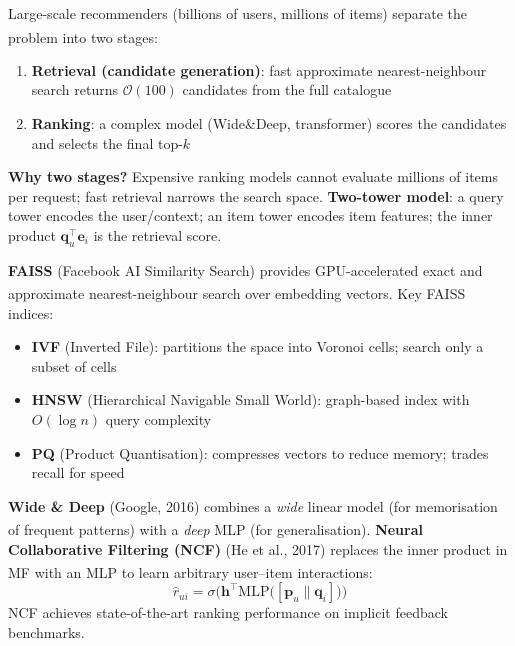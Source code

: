 \begin{tcbitemize}[ skin=sectionraster ]

    \tcbitem[title=Two-Stage Retrieval Architecture, raster multicolumn=6]
    Large-scale recommenders (billions of users, millions of items) separate the problem into two stages\textsuperscript{\cite[][pp.~95--100]{aggarwalRecommenderSystems2016}}:
    \begin{enumerate}
        \item \textbf{Retrieval (candidate generation)}: fast approximate nearest-neighbour search returns $\mathcal{O}(100)$ candidates from the full catalogue
        \item \textbf{Ranking}: a complex model (Wide\&Deep, transformer) scores the candidates and selects the final top-$k$
    \end{enumerate}
    \tcblower
    \textbf{Why two stages?} Expensive ranking models cannot evaluate millions of items per request; fast retrieval narrows the search space.
    \textbf{Two-tower model}: a query tower encodes the user/context; an item tower encodes item features; the inner product $\mathbf{q}_u^\top \mathbf{e}_i$ is the retrieval score.

    \tcbitem[title={Approximate Nearest Neighbour (ANN)}, raster multicolumn=3]
    \textbf{FAISS} (Facebook AI Similarity Search) provides GPU-accelerated exact and approximate nearest-neighbour search over embedding vectors\textsuperscript{\cite[][p.~535]{liFaissLibraryEfficient2019}}.
    Key FAISS indices:
    \begin{itemize}
        \item \textbf{IVF} (Inverted File): partitions the space into Voronoi cells; search only a subset of cells
        \item \textbf{HNSW} (Hierarchical Navigable Small World): graph-based index with $O(\log n)$ query complexity
        \item \textbf{PQ} (Product Quantisation): compresses vectors to reduce memory; trades recall for speed
    \end{itemize}

    \tcbitem[title={Wide \& Deep / Neural CF}, raster multicolumn=3]
    \textbf{Wide \& Deep} (Google, 2016) combines a \emph{wide} linear model (for memorisation of frequent patterns) with a \emph{deep} MLP (for generalisation)\textsuperscript{\cite[][p.~7]{chengWideDeepLearning2016}}.
    \textbf{Neural Collaborative Filtering (NCF)} (He et al., 2017) replaces the inner product in MF with an MLP to learn arbitrary user--item interactions\textsuperscript{\cite[][p.~173]{heNeuralCollaborativeFiltering2017}}:
    \begin{equation}
        \hat{r}_{ui} = \sigma\!\bigl(\mathbf{h}^\top \text{MLP}\bigl([\mathbf{p}_u \| \mathbf{q}_i]\bigr)\bigr)
    \end{equation}
    NCF achieves state-of-the-art ranking performance on implicit feedback benchmarks.


\end{tcbitemize}
